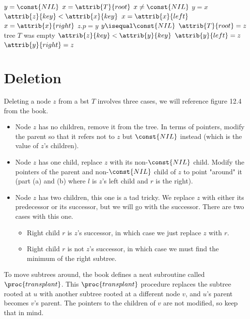 \documentclass{article}
\begin{document}
\begin{codebox}
\li $y = \const{NIL}$
\li $x = \attrib{T}{root}$
\li \While $x \neq \const{NIL}$
    \Do
    \li     $y = x$
        \li \If $\attrib{z}{key} < \attrib{x}{key}$
        \li \Then
                $x = \attrib{x}{left}$
        \li \Else
        \li     $x = \attrib{x}{right}$
            \End
    \End
\li $z.p = y$
\li \If $y \isequal \const{NIL}$
\li \Then
        $\attrib{T}{root} = z$ \Comment tree $T$ was empty
\li \ElseIf $\attrib{z}{key} < \attrib{y}{key}$
\li \Then
        $\attrib{y}{left} = z$
\li \Else
\li     $\attrib{y}{right} = z$
    \End
    
\end{codebox}

\section*{Deletion}
Deleting a node $z$ from a bst $T$ involves three cases, we will reference figure 12.4 from the book.
\begin{itemize}
    \item Node $z$ has no children, remove it from the tree. In terms of pointers, modify the parent so that it refers not to $z$ but $\const{NIL}$ instead (which is the value of $z$'s children).
    \item Node $z$ has one child, replace $z$ with its non-$\const{NIL}$ child. Modify the pointers of the parent and non-$\const{NIL}$ child of $z$ to point "around" it (part (a) and (b) where $l$ is $z$'s left child and $r$ is the right).
    \item Node $z$ has two children, this one is a tad tricky. We replace $z$ with either its predecessor or its successor, but we will go with the successor. There are two cases with this one.
    \begin{itemize}
        \item Right child $r$ is $z$'s successor, in which case we just replace $z$ with $r$.
        \item Right child $r$ is not $z$'s successor, in which case we must find the minimum of the right subtree.
    \end{itemize}
\end{itemize}

\newpage

To move subtrees around, the book defines a neat subroutine called $\proc{transplant}$. This $\proc{transplant}$ procedure replaces the subtree rooted at $u$ with another subtree rooted at a different node $v$, and $u$'s parent becomes $v$'s parent. The pointers to the children of $v$ are not modified, so keep that in mind.
\end{document}
